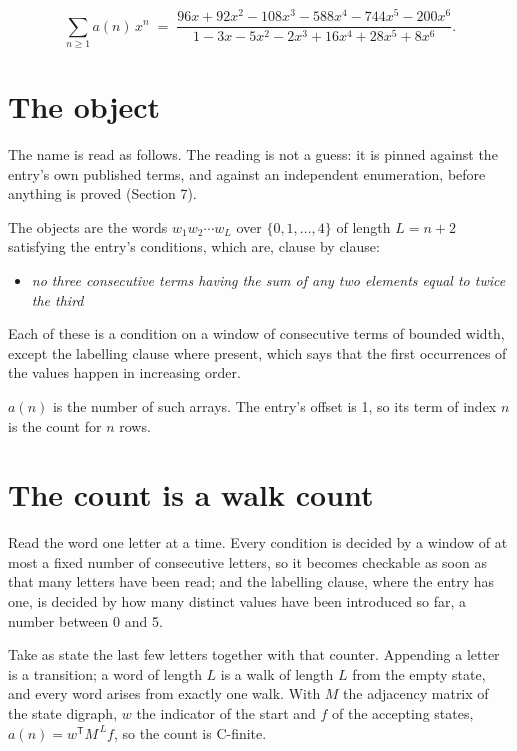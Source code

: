 \documentclass[11pt]{article}
\theoremstyle{definition}
\begin{document}
\[\sum_{n \ge 1} a(n)\,x^n \;=\; \frac{96x + 92x^{2} - 108x^{3} - 588x^{4} - 744x^{5} - 200x^{6}}{1 - 3x - 5x^{2} - 2x^{3} + 16x^{4} + 28x^{5} + 8x^{6}}.\]

\section{The object}

The name is read as follows. The reading is not a guess: it is pinned against the entry's own published terms, and against an independent enumeration, before anything is proved (Section 7).

The objects are the words $w_1 w_2 \cdots w_L$ over $\{0,1,\dots,4\}$ of length $L = n + 2$ satisfying the entry's conditions, which are, clause by clause:

\begin{itemize}

\item {\itshape no three consecutive terms having the sum of any two elements equal to twice the third}

\end{itemize}

Each of these is a condition on a window of consecutive terms of bounded width, except the labelling clause where present, which says that the first occurrences of the values happen in increasing order.

$a(n)$ is the number of such arrays. The entry's offset is 1, so its term of index $n$ is the count for $n$ rows.

\section{The count is a walk count}

Read the word one letter at a time. Every condition is decided by a window of at most a fixed number of consecutive letters, so it becomes checkable as soon as that many letters have been read; and the labelling clause, where the entry has one, is decided by how many distinct values have been introduced so far, a number between $0$ and 5.

Take as state the last few letters together with that counter. Appending a letter is a transition; a word of length $L$ is a walk of length $L$ from the empty state, and every word arises from exactly one walk. With $M$ the adjacency matrix of the state digraph, $w$ the indicator of the start and $f$ of the accepting states, $a(n) = w^{\mathsf T}M^{\,L}f$, so the count is C-finite.
\end{document}
